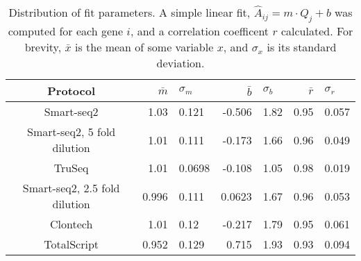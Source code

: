 
\begin{table}[htdp]

\caption{Distribution of fit parameters. A simple linear fit,
             $\hat{A}_{ij} = m \cdot Q_{j} + b$
             was computed for each gene $i$, and a correlation coefficent $r$
             calculated.  For brevity,
             $\bar{x}$ is the mean of some variable $x$, and $\sigma_x$ is its
             standard deviation.  }
             \begin{center}
             \begin{tabular}{|c|r@{$\pm$}l|r@{$\pm$}l|r@{$\pm$}l|}
             \hline Protocol & $\bar{m}$ & $\sigma_m$ & $\bar{b}$ & $\sigma_b$
                    & $\bar{r}$ & $\sigma_r$ \\\hline
             Smart-seq2 & 1.03 & 0.121 & -0.506 & 1.82 & 0.95 & 0.057 \\
Smart-seq2, 5 fold dilution & 1.01 & 0.111 & -0.173 & 1.66 & 0.96 & 0.049 \\
TruSeq & 1.01 & 0.0698 & -0.108 & 1.05 & 0.98 & 0.019 \\
Smart-seq2, 2.5 fold dilution & 0.996 & 0.111 & 0.0623 & 1.67 & 0.96 & 0.053 \\
Clontech & 1.01 & 0.12 & -0.217 & 1.79 & 0.95 & 0.061 \\
TotalScript & 0.952 & 0.129 & 0.715 & 1.93 & 0.93 & 0.094 \\

\hline

\end{tabular}
\label{tab:fits}
\end{center}
\end{table}



              